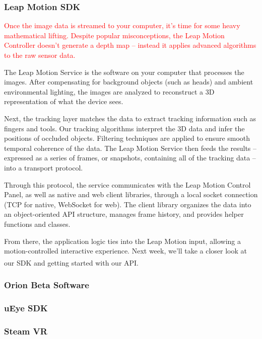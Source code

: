 \subsubsection{Leap Motion SDK} 
\textcolor{red}{
Once the image data is streamed to your computer, it’s time for some heavy mathematical lifting. Despite popular misconceptions, the Leap Motion Controller doesn’t generate a depth map – instead it applies advanced algorithms to the raw sensor data.}

The Leap Motion Service is the software on your computer that processes the images. After compensating for background objects (such as heads) and ambient environmental lighting, the images are analyzed to reconstruct a 3D representation of what the device sees.

Next, the tracking layer matches the data to extract tracking information such as fingers and tools. Our tracking algorithms interpret the 3D data and infer the positions of occluded objects. Filtering techniques are applied to ensure smooth temporal coherence of the data. The Leap Motion Service then feeds the results – expressed as a series of frames, or snapshots, containing all of the tracking data – into a transport protocol.

Through this protocol, the service communicates with the Leap Motion Control Panel, as well as native and web client libraries, through a local socket connection (TCP for native, WebSocket for web). The client library organizes the data into an object-oriented API structure, manages frame history, and provides helper functions and classes.

From there, the application logic ties into the Leap Motion input, allowing a motion-controlled interactive experience. Next week, we’ll take a closer look at our SDK and getting started with our API.\textsuperscript{\cite{website:LeapMotionBlog}}

\subsubsection{Orion Beta Software} \label{OBS}

\subsubsection{uEye SDK}
\subsubsection{Steam VR}


\newpage